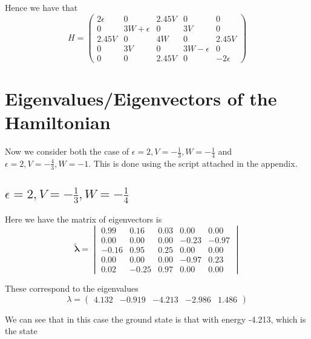 \documentclass[11pt]{article} %
\begin{document}
Hence we have that\\

\begin{equation}
H=\begin{pmatrix} 2\epsilon & 0 &2.45 V & 0 & 0\\
			0 & 3 W + \epsilon & 0& 3 V & 0\\
			2.45 V & 0 & 4W & 0 & 2.45 V\\
			0 & 3 V & 0 & 3 W-\epsilon & 0 \\
			0 & 0 & 2.45 V & 0 &-2\epsilon  \end{pmatrix} \end{equation}


\section{Eigenvalues/Eigenvectors of the Hamiltonian}

Now we consider both the case of $\epsilon=2, V=-\frac{1}{3}, W=-\frac{1}{4}$ and $\epsilon=2, V=-\frac{4}{3}, W=-1$. This is done using the script attached in the appendix.\\


\subsection{$\epsilon=2, V=-\frac{1}{3}, W=-\frac{1}{4}$}

Here we have the matrix of eigenvectors is 
\begin{equation} \mathbf{\tilde{\lambda}}=\begin{vmatrix} 0.99 & 0.16 & 0.03 & 0.00 & 0.00 \\
0.00 & 0.00 & 0.00 & -0.23 & -0.97 \\
-0.16 & 0.95 & 0.25 & 0.00 & 0.00 \\
0.00 & 0.00 & 0.00 & -0.97 & 0.23 \\
0.02 & -0.25 & 0.97 & 0.00 & 0.00\end{vmatrix}
\end{equation}

These correspond to the eigenvalues
\begin{equation}
\lambda=\begin{pmatrix} 4.132 & -0.919 & -4.213 & -2.986 & 1.486\end{pmatrix} \end{equation}


We can see that in this case the ground state is that with energy  -4.213, which is the state\\
\end{document}
